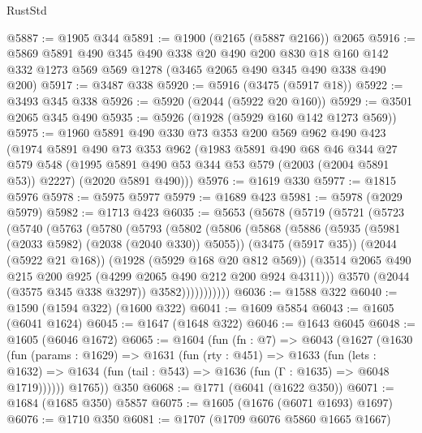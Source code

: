\begin{lexlean}{RustStd}
\begin{coremodule}
@5887 := @1905 @344
@5891 := @1900 (@2165 (@5887 @2166)) @2065
@5916 := @5869
    @5891
    @490
    @345
    @490
    @338
    @20
    @490
    @200
    @830
    @18
    @160
    @142
    @332
    @1273
    @569
    @569
    @1278
    (@3465 @2065 @490 @345 @490 @338 @490 @200)
@5917 := @3487 @338
@5920 := @5916 (@3475 (@5917 @18))
@5922 := @3493 @345 @338
@5926 := @5920 (@2044 (@5922 @20 @160))
@5929 := @3501 @2065 @345 @490
@5935 := @5926 (@1928 (@5929 @160 @142 @1273 @569))
@5975 := @1960
    @5891
    @490
    @330
    @73
    @353
    @200
    @569
    @962
    @490
    @423
    (@1974
      @5891
      @490
      @73
      @353
      @962
      (@1983
        @5891
        @490
        @68
        @46
        @344
        @27
        @579
        @548
        (@1995 @5891 @490 @53 @344 @53 @579 (@2003 (@2004 @5891 @53)) @2227)
        (@2020 @5891 @490)))
@5976 := @1619 @330
@5977 := @1815 @5976
@5978 := @5975 @5977
@5979 := @1689 @423
@5981 := @5978 (@2029 @5979)
@5982 := @1713 @423
@6035 := @5653
    (@5678
      (@5719
        (@5721
          (@5723
            (@5740
              (@5763
                (@5780
                  (@5793
                    (@5802
                      (@5806
                        (@5868
                          (@5886
                            (@5935 (@5981 (@2033 @5982) (@2038 (@2040 @330)) @5055))
                            (@3475 (@5917 @35))
                            (@2044 (@5922 @21 @168))
                            (@1928 (@5929 @168 @20 @812 @569))
                            (@3514
                              @2065
                              @490
                              @215
                              @200
                              @925
                              (@4299 @2065 @490 @212 @200 @924 @4311)))
                          @3570
                          (@2044 (@3575 @345 @338 @3297))
                          @3582)))))))))))
@6036 := @1588 @322
@6040 := @1590 (@1594 @322) (@1600 @322)
@6041 := @1609 @5854
@6043 := @1605 (@6041 @1624)
@6045 := @1647 (@1648 @322)
@6046 := @1643 @6045
@6048 := @1605 (@6046 @1672)
@6065 := @1604
    (fun (fn : @7) =>
    @6043
      (@1627
        (@1630
          (fun (params : @1629) =>
          @1631
            (fun (rty : @451) =>
            @1633
              (fun (lets : @1632) =>
              @1634 (fun (tail : @543) => @1636 (fun (Γ : @1635) => @6048 @1719))))))
        @1765))
    @350
@6068 := @1771 (@6041 (@1622 @350))
@6071 := @1684 (@1685 @350) @5857
@6075 := @1605 (@1676 (@6071 @1693) @1697)
@6076 := @1710 @350
@6081 := @1707 (@1709 @6076 @5860 @1665 @1667)

\end{coremodule}
\end{lexlean}

